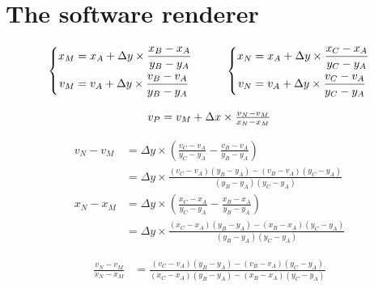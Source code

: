 \chapter{The software renderer}

\newcommand{\dy}{\Delta y}
\newcommand{\dx}{\Delta x}


\begin{displaymath}
  \begin{array}{c}
    \begin{array}{c@{\quad\quad\quad}c}
      \left\{
        \begin{aligned}
          x_M & = x_A + \dy \times \frac{x_B - x_A}{y_B - y_A} \\
          v_M & = v_A + \dy \times \frac{v_B - v_A}{y_B - y_A} 
        \end{aligned}
      \right.
      &
      \left\{
        \begin{aligned}
          x_N & = x_A + \dy \times \frac{x_C - x_A}{y_C - y_A} \\
          v_N & = v_A + \dy \times \frac{v_C - v_A}{y_C - y_A} \\
        \end{aligned}
      \right.
    \end{array}
    \\
    \\
    v_P = v_M + \dx \times \frac{v_N - v_M}{x_N - x_M}
  \end{array}
\end{displaymath}

\begin{align*}
v_N - v_M & = \dy \times \left(\frac{v_C - v_A}{y_C - y_A} - \frac{v_B - v_A}{y_B - y_A}\right) \\
& = \dy \times \frac{(v_C - v_A)(y_B - y_A) - (v_B - v_A)(y_C - y_A)}{(y_B - y_A)(y_C - y_A)}
\\
x_N - x_M & = \dy \times \left(\frac{x_C - x_A}{y_C - y_A} - \frac{x_B - x_A}{y_B - y_A}\right) \\
& = \dy \times \frac{(x_C - x_A)(y_B - y_A) - (x_B - x_A)(y_C - y_A)}{(y_B - y_A)(y_C - y_A)}
\end{align*}

\begin{align*}
\frac{v_N - v_M}{x_N - x_M} & = \frac{(v_C - v_A)(y_B - y_A) - (v_B - v_A)(y_C - y_A)}{(x_C - x_A)(y_B - y_A) - (x_B - x_A)(y_C - y_A)}
\end{align*}
